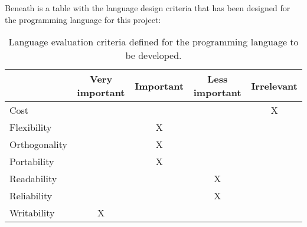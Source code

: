 Beneath is a table with the language design criteria that has been designed for the programming language for this project:
\begin{table}[htbp]
\centering
\begin{tabular}{|l|c|c|c|c|}
\hline
& Very important & Important & Less important & Irrelevant \\ \hline
Cost & & & & X \\ \hline
Flexibility & & X & &  \\ \hline
Orthogonality & & X & & \\ \hline
Portability & & X & & \\ \hline
Readability & & & X & \\ \hline
Reliability & & & X & \\ \hline
Writability & X & & & \\ \hline
\end{tabular}
\caption{Language evaluation criteria defined for the programming language to be developed.}
\label{tbl:evaluation criteria}
\end{table}